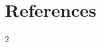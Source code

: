 \documentclass[11pt]{article}
\begin{document}








\section*{References}
\renewcommand{\bibsection}{}
\begin{multicols}{2}
\renewcommand{\bibfont}{\scriptsize}
\setlength{\bibsep}{0pt plus 0.2ex}

\end{multicols}
\end{document}
